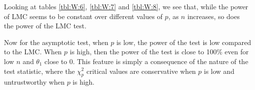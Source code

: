 \documentclass[11pt]{article}\usepackage[]{graphicx}\usepackage[]{color}
\begin{document}
\begin{table}[H]
	\centering
	\caption{Empirical levels for 1000 replications of the Wald statistic where $\alpha = 5\%$, $\theta_1=1$ and $\theta_2=...=\theta_p=0$,  testing $H_0: \theta_1^2 + ...  +\theta_p^2 =0$ against $H_1: \theta_1^2 + ...  +\theta_p^2  \neq 0$}
	\label{tbl:W:8}
\end{table}



Looking at tables \ref{tbl:W:6}, \ref{tbl:W:7} and  \ref{tbl:W:8}, we see that, while the power of LMC seems to be constant over different values of $p$, as $n$ increases, so does the power of the LMC test.

Now for the asymptotic test, when $p$ is low, the power of the test is low compared to the LMC. When $p$ is high, then the power of the test is close to 100\% even for low $n$ and $\theta_1$ close to 0. This feature is simply a consequence of the nature of the test statistic, where the $\chi_p^2$ critical values are conservative when $p$ is low and untrustworthy when $p$ is high.
\end{document}

